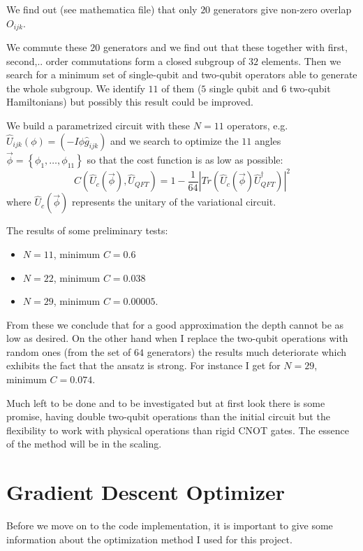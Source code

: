 \documentclass[inscr,ack,preface]{diphdthesis}
\begin{document}
We find out (see mathematica file) that only $20$ generators give non-zero overlap $O_{ijk}$.

We commute these $20$ generators and we find out that these together with first, second,.. order commutations form
a closed subgroup of $32$ elements. Then we search for a minimum set of single-qubit and two-qubit operators able to generate the whole
subgroup. We identify $11$ of them ($5$ single qubit and $6$ two-qubit Hamiltonians) but possibly this result could be improved.

We build a parametrized circuit with these $N=11$ operators, e.g. $\hat{U}_{ijk}\left(\phi\right)=\left(-I \phi \hat{g}_{ijk}\right)$ and we search to optimize the $11$ angles $\vec{\phi}=\left\{\phi_1,\ldots, \phi_{11}\right\}$ so that the cost function is as low as possible:
\begin{equation}
C\left(\hat{U}_c\left(\vec{\phi}\right), \hat{U}_{QFT}\right)=1-\frac{1}{64}\left|Tr\left(\hat{U}_c\left(\vec{\phi}\right)\hat{U}_{QFT}^{\dagger} \right)\right|^2
\end{equation}
where $\hat{U}_c\left(\vec{\phi}\right)$ represents the unitary of the variational circuit.

The results of some preliminary tests:
\begin{itemize}
	\item $N=11$, minimum $C=0.6$
	\item $N=22$, minimum $C=0.038$
	\item $N=29$, minimum $C=0.00005$.
\end{itemize}
From these we conclude that for a good approximation the depth cannot be as low as desired.
On the other hand when I replace the two-qubit operations with random ones (from the set of $64$ generators) the 
results much deteriorate which exhibits the fact that the ansatz is strong. For instance I get for $N=29$, minimum $C=0.074$.

Much left to be done and to be investigated but at first look there is some promise, having double two-qubit operations
than the initial circuit but the flexibility to work with physical operations than rigid CNOT gates.
The essence of the method will be in the scaling.


\section{Gradient Descent Optimizer}

Before we move on to the code implementation, it is important to give some information about the optimization method I used for this project. 
\end{document}
